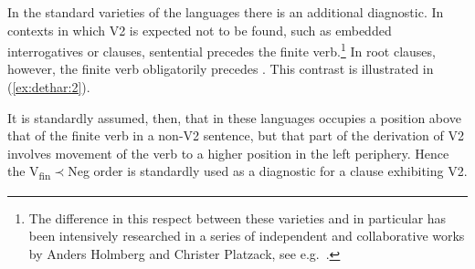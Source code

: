 \documentclass[output=paper]{langsci/langscibook}
\begin{document}
In the standard varieties of the  languages there is an additional diagnostic. In contexts in which V2 is expected not to be found, such as embedded interrogatives or  clauses, sentential  precedes the finite verb.\footnote{The difference in this respect between these varieties and  in particular has been intensively researched in a series of independent and collaborative works by Anders Holmberg and Christer Platzack, see e.g.\ \cite{Platzack1987,PlatzackHolmberg1989,HolmbergPlatzack1991,HolmbergPlatzack1995,Holmberg2010parameters}.}   In root clauses, however, the finite verb obligatorily precedes . This contrast is illustrated in (\ref{ex:dethar:2}). 


It is standardly assumed, then, that  in these languages occupies a position above that of the finite verb in a non-V2 sentence, but that part of the derivation of V2 involves movement of the verb to a higher position in the left periphery.  Hence the V\textsubscript{fin}$\prec$Neg order is standardly used as a diagnostic for a clause exhibiting V2.
\end{document}
